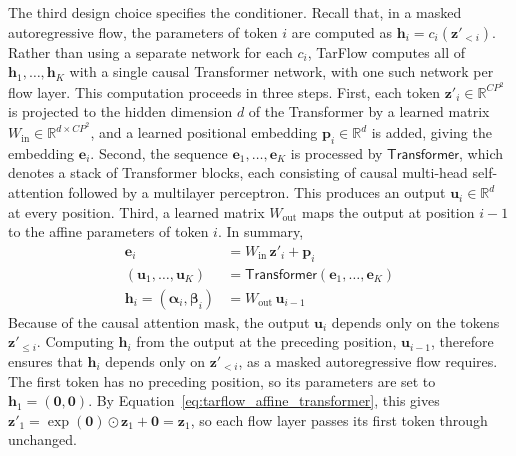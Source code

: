 \documentclass[12pt,a4paper]{report}
\begin{document}

The third design choice specifies the conditioner. Recall that, in a masked autoregressive flow, the parameters of token $i$ are computed as $\mathbf{h}_i=c_i(\mathbf{z}'_{<i})$. Rather than using a separate network for each $c_i$, TarFlow computes all of $\mathbf{h}_1,\ldots,\mathbf{h}_K$ with a single causal Transformer network, with one such network per flow layer. This computation proceeds in three steps. First, each token $\mathbf{z}'_i\in\mathbb{R}^{CP^2}$ is projected to the hidden dimension $d$ of the Transformer by a learned matrix $W_{\mathrm{in}}\in\mathbb{R}^{d\times CP^2}$, and a learned positional embedding $\mathbf{p}_i\in\mathbb{R}^{d}$ is added, giving the embedding $\mathbf{e}_i$. Second, the sequence $\mathbf{e}_1,\ldots,\mathbf{e}_K$ is processed by $\mathsf{Transformer}$, which denotes a stack of Transformer blocks, each consisting of causal multi-head self-attention followed by a multilayer perceptron. This produces an output $\mathbf{u}_i\in\mathbb{R}^{d}$ at every position. Third, a learned matrix $W_{\mathrm{out}}$ maps the output at position $i-1$ to the affine parameters of token $i$. In summary,
\begin{equation}
\begin{aligned}
\mathbf{e}_i
&=
W_{\mathrm{in}}\,\mathbf{z}'_i+\mathbf{p}_i
\\
(\mathbf{u}_1,\ldots,\mathbf{u}_K)
&=
\mathsf{Transformer}(\mathbf{e}_1,\ldots,\mathbf{e}_K)
\\
\mathbf{h}_i=(\boldsymbol{\alpha}_i,\boldsymbol{\beta}_i)
&=
W_{\mathrm{out}}\,\mathbf{u}_{i-1}
\end{aligned}
\label{eq:tarflow_conditioner}
\end{equation}
Because of the causal attention mask, the output $\mathbf{u}_i$ depends only on the tokens $\mathbf{z}'_{\leq i}$. Computing $\mathbf{h}_i$ from the output at the preceding position, $\mathbf{u}_{i-1}$, therefore ensures that $\mathbf{h}_i$ depends only on $\mathbf{z}'_{<i}$, as a masked autoregressive flow requires. The first token has no preceding position, so its parameters are set to $\mathbf{h}_1=(\mathbf{0},\mathbf{0})$. By Equation~\ref{eq:tarflow_affine_transformer}, this gives $\mathbf{z}'_1=\exp(\mathbf{0})\odot\mathbf{z}_1+\mathbf{0}=\mathbf{z}_1$, so each flow layer passes its first token through unchanged.
\end{document}
